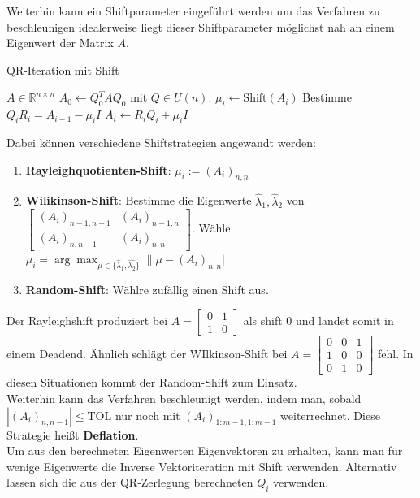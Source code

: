 \documentclass[10pt,a4paper]{article}
\begin{document}
	Weiterhin kann ein Shiftparameter eingeführt werden um das Verfahren zu beschleunigen idealerweise liegt dieser Shiftparameter möglichst nah an einem Eigenwert der Matrix $A$.
	\begin{algorithm}[H]
		\caption{QR-Iteration mit Shift}
		\begin{algorithmic}
			\Require $A\in \mathbb{R}^{n \times n}$
			\State $A_0 \leftarrow Q_0^TAQ_0$ mit $Q\in U(n)$.
			\State $\mu_i \leftarrow \text{Shift}(A_i)$
			\State Bestimme $Q_iR_i = A_{i-1} -\mu_i I$
			\State $A_{i} \leftarrow R_iQ_i + \mu_i I$
			\EndFor
		\end{algorithmic}
	\end{algorithm}
	Dabei können verschiedene Shiftstrategien angewandt werden:
	\begin{enumerate}
		\item \textbf{Rayleighquotienten-Shift}: $\mu_i := (A_i)_{n,n}$
		\item \textbf{Wilikinson-Shift}: Bestimme die Eigenwerte $\hat\lambda_1, \hat\lambda_2$ von $\begin{bmatrix}
			(A_i)_{n-1, n-1} & (A_i)_{n-1, n} \\
			(A_i)_{n, n-1} & (A_i)_{n, n}
		\end{bmatrix}$.
		Wähle $\mu_i = \arg\max_{\mu \in \{\hat\lambda_1, \hat{\lambda_2}\}}\|\mu -(A_i)_{n,n}|$
		\item \textbf{Random-Shift}: Wählre zufällig einen Shift aus.
	\end{enumerate}
	Der Rayleighshift produziert bei $A=\begin{bmatrix}
		0 & 1 \\
		1 & 0 
	\end{bmatrix}$ als shift $0$ und landet somit in einem Deadend. Ähnlich schlägt der WIlkinson-Shift bei $A=\begin{bmatrix}
		0 & 0 & 1\\
		1 & 0 & 0 \\
		0 & 1 & 0
	\end{bmatrix}$ fehl. In diesen Situationen kommt der Random-Shift zum Einsatz. \\
	Weiterhin kann das Verfahren beschleunigt werden, indem man, sobald $|(A_i)_{n, n-1}| \leq \text{TOL}$ nur noch mit $(A_i)_{1:m-1, 1:m-1}$ weiterrechnet. Diese Strategie heißt \textbf{Deflation}. \\
	Um aus den berechneten Eigenwerten Eigenvektoren zu erhalten, kann man für wenige Eigenwerte die Inverse Vektoriteration mit Shift verwenden. Alternativ lassen sich die aus der QR-Zerlegung berechneten $Q_i$ verwenden.
\end{document}
